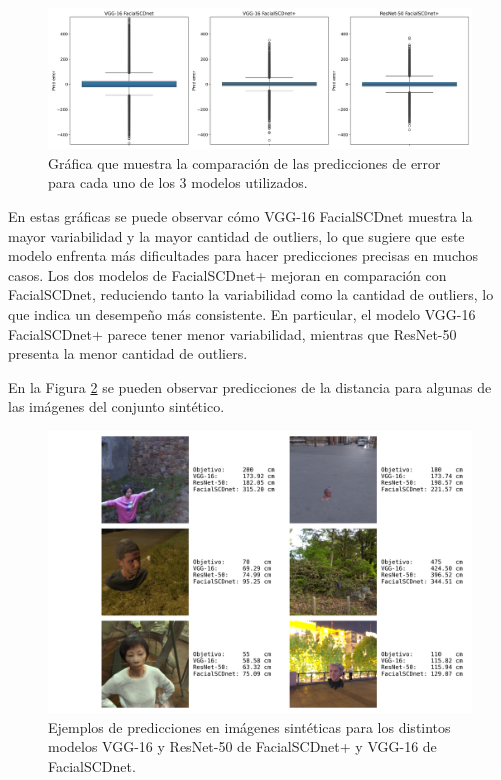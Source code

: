 \begin{figure}[h]
	\centering
	\includegraphics[width=\textwidth]{imagenes/cap5/boxplot_own.png}
	\caption[Comparación predicciones de error test sintético.]{Gráfica que muestra la comparación de las predicciones de error para cada uno de los 3 modelos utilizados.}
	\label{fig33}
\end{figure}

En estas gráficas se puede observar cómo VGG-16 FacialSCDnet muestra la mayor variabilidad y la mayor cantidad de outliers, lo que sugiere que este modelo enfrenta más dificultades para hacer predicciones precisas en muchos casos. Los dos modelos de FacialSCDnet+ mejoran en comparación con FacialSCDnet, reduciendo tanto la variabilidad como la cantidad de outliers, lo que indica un desempeño más consistente. En particular, el modelo VGG-16 FacialSCDnet+ parece tener menor variabilidad, mientras que ResNet-50 presenta la menor cantidad de outliers.

En la Figura \ref{fig36} se pueden observar predicciones de la distancia para algunas de las imágenes del conjunto sintético.

\begin{figure}[h]
	\centering
	\includegraphics[width=\textwidth]{imagenes/cap5/predicts_own.png}
	\caption[Ejemplos de predicciones en imágenes sintéticas.]{Ejemplos de predicciones en imágenes sintéticas para los distintos modelos VGG-16 y ResNet-50 de FacialSCDnet+ y VGG-16 de FacialSCDnet.}
	\label{fig36}
\end{figure}

